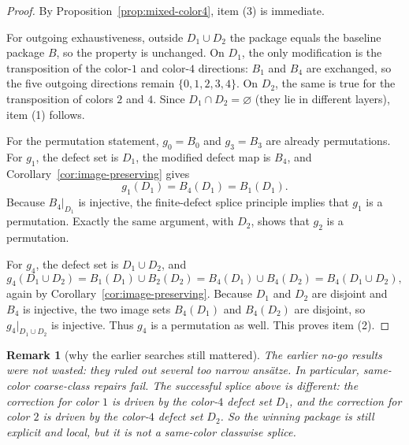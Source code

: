 \documentclass[11pt]{article}
\newtheorem{remark}[theorem]{Remark}
\begin{document}
\begin{proof}
By Proposition~\ref{prop:mixed-color4}, item \textup{(3)} is immediate.

For outgoing exhaustiveness, outside \(D_1\cup D_2\) the package equals the
baseline package \(B\), so the property is unchanged.
On \(D_1\), the only modification is the transposition of the color-\(1\) and
color-\(4\) directions: \(B_1\) and \(B_4\) are exchanged, so the five outgoing
directions remain \(\{0,1,2,3,4\}\).
On \(D_2\), the same is true for the transposition of colors \(2\) and \(4\).
Since \(D_1\cap D_2=\varnothing\) (they lie in different layers), item
\textup{(1)} follows.

For the permutation statement, \(g_0=B_0\) and \(g_3=B_3\) are already
permutations.
For \(g_1\), the defect set is \(D_1\), the modified defect map is \(B_4\), and
Corollary~\ref{cor:image-preserving} gives
\[
g_1(D_1)=B_4(D_1)=B_1(D_1).
\]
Because \(B_4\vert_{D_1}\) is injective, the finite-defect splice principle
implies that \(g_1\) is a permutation.
Exactly the same argument, with \(D_2\), shows that \(g_2\) is a permutation.

For \(g_4\), the defect set is \(D_1\cup D_2\), and
\[
g_4(D_1\cup D_2)=B_1(D_1)\cup B_2(D_2)=B_4(D_1)\cup B_4(D_2)=B_4(D_1\cup D_2),
\]
again by Corollary~\ref{cor:image-preserving}.
Because \(D_1\) and \(D_2\) are disjoint and \(B_4\) is injective, the two image
sets \(B_4(D_1)\) and \(B_4(D_2)\) are disjoint, so \(g_4\vert_{D_1\cup D_2}\)
is injective.
Thus \(g_4\) is a permutation as well.
This proves item \textup{(2)}.
\end{proof}

\begin{remark}[why the earlier searches still mattered]
The earlier no-go results were not wasted:
they ruled out several \emph{too narrow} ans\"atze.
In particular, same-color coarse-class repairs fail.
The successful splice above is different: the correction for color \(1\) is
driven by the color-\(4\) defect set \(D_1\), and the correction for color \(2\)
is driven by the color-\(4\) defect set \(D_2\).
So the winning package is still explicit and local, but it is not a same-color
classwise splice.
\end{remark}
\end{document}
